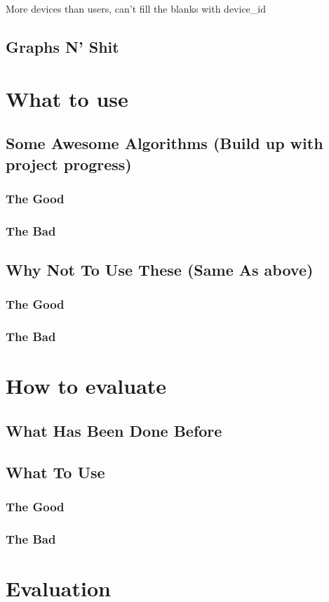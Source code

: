 More devices than users, can't fill the blanks with device_id

\subsection{Graphs N' Shit}

\section{What to use}
\subsection{Some Awesome Algorithms (Build up with project progress)}
\subsubsection{The Good}
\subsubsection{The Bad}
\subsection{Why Not To Use These (Same As above)}
\subsubsection{The Good}
\subsubsection{The Bad}

\section{How to evaluate}
\subsection{What Has Been Done Before}
\subsection{What To Use}
\subsubsection{The Good}
\subsubsection{The Bad}

\section{Evaluation}
